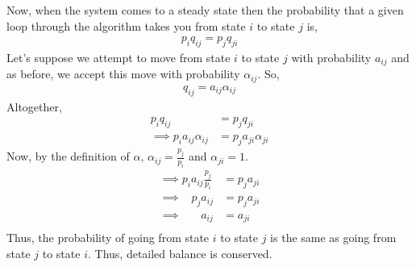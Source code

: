 \documentclass[12pt]{article}
\begin{document}
Now, when the system comes to a steady state then the probability that a given loop through the algorithm takes you from state $i$ to state $j$ is,
\begin{align} 
p_{i}q_{i j} = p_{j}q_{ji}
\end{align}
Let's suppose we attempt to move from state $i$ to state $j$ with probability $a_{i j}$ and as before, we accept this move with probability $\alpha_{i j}$. So, 
\begin{align} 
q_{ij} = a_{ij}\alpha_{ij}
\end{align}
Altogether, 
\begin{align} 
p_{i}q_{i j} &= p_{j}q_{ji} \\
\implies p_{i}a_{i j}\alpha_{i j} &= p_{j}a_{j i}\alpha_{j i}
\end{align}
Now, by the definition of $\alpha$, $\alpha_{i j} = \frac{p_{j}}{p_{i}}$ and $\alpha_{j i} = 1$.
\begin{align} 
\implies p_{i}a_{i j} \frac{p_{j}}{p_{i}} &= p_{j}a_{j i} \\
\implies \; \; \; p_{j}a_{i j} &= p_{j}a_{j i} \\
\implies \; \; \; \; \; \; a_{i j} &= a_{j i} \\
\end{align}
Thus, the probability of going from state $i$ to state $j$ is the same as going from state $j$ to state $i$. Thus, detailed balance is conserved. 
\end{document}
